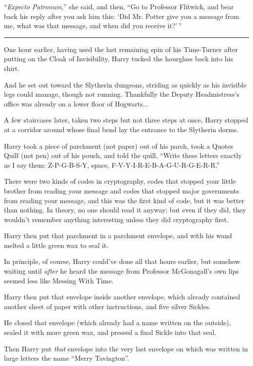 ``\emph{Expecto Patronum},'' she said, and then, ``Go to Professor
Flitwick, and bear back his reply after you ask him this: `Did Mr.
Potter give you a message from me, what was that message, and when did
you receive it?'\,''

\begin{center}\rule{3in}{0.4pt}\end{center}

One hour earlier, having used the last remaining spin of his Time-Turner
after putting on the Cloak of Invisibility, Harry tucked the hourglass
back into his shirt.

And he set out toward the Slytherin dungeons, striding as quickly as his
invisible legs could manage, though not running. Thankfully the Deputy
Headmistress's office was already on a lower floor of Hogwarts...

A few staircases later, taken two steps but not three steps at once,
Harry stopped at a corridor around whose final bend lay the entrance to
the Slytherin dorms.

Harry took a piece of parchment (not paper) out of his parch, took a
Quotes Quill (not pen) out of his pouch, and told the quill, ``Write
these letters exactly as I say them: Z-P-G-B-S-Y, space,
F-V-Y-I-R-E-B-A-G-U-R-G-E-R-R.''

There were two kinds of codes in cryptography, codes that stopped your
little brother from reading your message and codes that stopped major
governments from reading your message, and this was the first kind of
code, but it was better than nothing. In theory, no one should read it
anyway; but even if they did, they wouldn't remember anything
interesting unless they did cryptography first.

Harry then put that parchment in a parchment envelope, and with his wand
melted a little green wax to seal it.

In principle, of course, Harry could've done all that hours earlier, but
somehow waiting until \emph{after} he heard the message from Professor
McGonagall's own lips seemed less like Messing With Time.

Harry then put that envelope inside another envelope, which already
contained another sheet of paper with other instructions, and five
silver Sickles.

He closed that envelope (which already had a name written on the
outside), sealed it with more green wax, and pressed a final Sickle into
that seal.

Then Harry put \emph{that} envelope into the very last envelope on which
was written in large letters the name ``Merry Tavington''.


